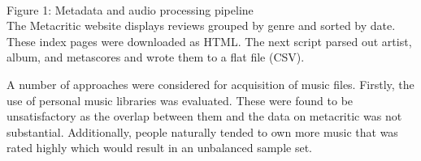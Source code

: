 \documentclass{acm_proc_article-sp}
\begin{document}
\setlength\fboxsep{0pt}
\setlength\fboxrule{0.5pt}
\\
Figure 1: Metadata and audio processing pipeline\\




The Metacritic website displays
reviews grouped by genre and sorted by date. These index pages were downloaded
as HTML. The next script parsed out artist, album, and metascores and wrote them
to a flat file (CSV). 

A number of approaches were considered for acquisition of music files.
Firstly, the use of personal music libraries was evaluated. These were
found to be unsatisfactory as the overlap between them and the data on metacritic
was not substantial. Additionally, people naturally tended to own more music
that was rated highly which would result in an unbalanced sample set.
\end{document}
